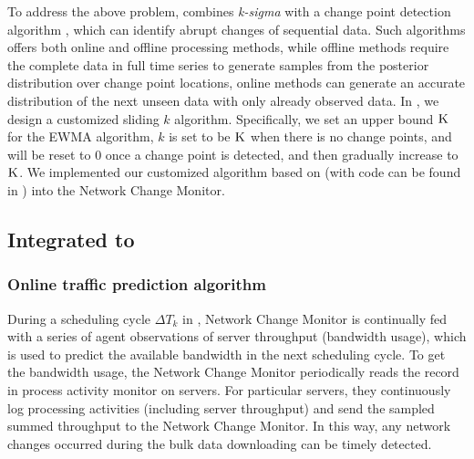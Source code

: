 {%
To address the above problem, \name combines \textit{k-sigma}  with  a change point detection algorithm \cite{adams2007bayesian}, which can identify abrupt changes of sequential data. Such algorithms offers both online and offline processing methods, while offline methods \cite{smith1975bayesian,stephens1994bayesian,barry1993bayesian,green1995reversible} require the complete data in full time series to generate samples from the posterior distribution over change point locations, online methods \cite{page1955test,desobry2005online,lorden1971procedures} can generate an accurate distribution of the next unseen data with only already observed data.  In \name, we design a customized sliding $k$ algorithm. Specifically, we set an upper bound $\textsc{K}$ for the EWMA algorithm, $k$ is set to be $\textsc{K}$ when there is no change points, and will be reset to $0$ once a change point is detected, and then gradually increase to $\textsc{K}$. We implemented our customized algorithm based on \cite{adams2007bayesian} (with code can be found in \cite{BOCDcode}) into the Network Change Monitor.

\subsection{Integrated to \bdsname}
\subsubsection{Online traffic prediction algorithm}


During a scheduling cycle $\Delta T_k$ in \name, Network Change Monitor is continually fed with a series of agent observations of server throughput (bandwidth usage), which is used to predict the available bandwidth in the next scheduling cycle. To get the bandwidth usage, the Network Change Monitor periodically reads the record in process activity monitor on servers. For particular servers, they continuously log processing activities (including server throughput) and send the sampled summed throughput to the Network Change Monitor. In this way, any network changes occurred during the bulk data downloading can be timely detected.

}
